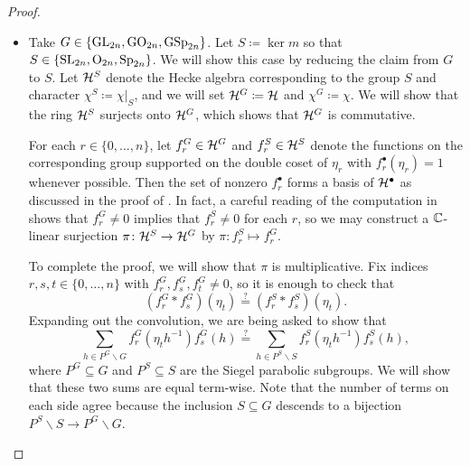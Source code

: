 \begin{proof}
\begin{itemize}
        \item Take $G\in\{\mathrm{GL}_{2n},\mathrm{GO}_{2n},\mathrm{GSp}_{2n}\}$. Let $S\coloneqq\ker m$ so that $S\in\{\mathrm{SL}_{2n},\mathrm{O}_{2n},\mathrm{Sp}_{2n}\}$.%
        We will show this case by reducing the claim from $G$ to $S$. Let $\mathcal{H}^S$ denote the Hecke algebra corresponding to the group $S$ and character $\chi^S\coloneqq\chi|_S$, and we will set $\mathcal{H}^G\coloneqq\mathcal{H}$ and $\chi^G\coloneqq\chi$. We will show that the ring $\mathcal{H}^S$ surjects onto $\mathcal{H}^G$, which shows that $\mathcal{H}^G$ is commutative.%
        
        For each $r\in\{0,\ldots,n\}$, let $f_r^G\in\mathcal{H}^G$ and $f_r^S\in\mathcal{H}^S$ denote the functions on the corresponding group supported on the double coset of $\eta_r$ with $f_r^\bullet(\eta_r)=1$ whenever possible. Then the set of nonzero $f_r^\bullet$ forms a basis of $\mathcal{H}^\bullet$ as discussed in the proof of . In fact, a careful reading of the computation in  shows that $f_r^G\ne0$ implies that $f_r^S\ne0$ for each $r$, so we may construct a $\mathbb C$-linear surjection $\pi\colon\mathcal{H}^S\to\mathcal{H}^G$ by $\pi\colon f_r^S\mapsto f_r^G$.

        To complete the proof, we will show that $\pi$ is multiplicative. Fix indices $r,s,t\in\{0,\ldots,n\}$ with $f_r^G,f_s^G,f_t^G\ne0$, so it is enough to check that
        \[\left(f_r^G*f_s^G\right)(\eta_t)\stackrel?=\left(f_r^S*f_s^S\right)(\eta_t).\]
        Expanding out the convolution, we are being asked to show that
        \[\sum_{h\in P^G\backslash G}f_r^G\left(\eta_th^{-1}\right)f_s^G(h)\stackrel?=\sum_{h\in P^S\backslash S}f_r^S\left(\eta_th^{-1}\right)f_s^S(h),\]
        where $P^G\subseteq G$ and $P^S\subseteq S$ are the Siegel parabolic subgroups. We will show that these two sums are equal term-wise. Note that the number of terms on each side agree because the inclusion $S\subseteq G$ descends to a bijection $P^S\backslash S\to P^G\backslash G$.


\end{itemize}
\end{proof}
